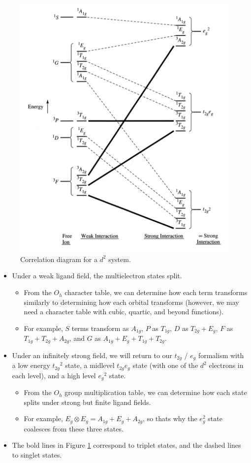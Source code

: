 \documentclass[../notes.tex]{subfiles}
\begin{document}
\begin{itemize}
    \begin{figure}[h!]
        \centering
        \includegraphics[width=0.45\linewidth]{../ExtFiles/correlationDiagram-d2.png}
        \caption{Correlation diagram for a $d^2$ system.}
        \label{fig:correlationDiagram-d2}
    \end{figure}
    \begin{itemize}
        \item Under a weak ligand field, the multielectron states split.
        \begin{itemize}
            \item From the $O_h$ character table, we can determine how each term transforms similarly to determining how each orbital transforms (however, we may need a character table with cubic, quartic, and beyond functions).
            \item For example, $S$ terms transform as $A_{1g}$, $P$ as $T_{1g}$, $D$ as $T_{2g}+E_g$, $F$ as $T_{1g}+T_{2g}+A_{2g}$, and $G$ as $A_{1g}+E_g+T_{1g}+T_{2g}$.
        \end{itemize}
        \item Under an infinitely strong field, we will return to our $t_{2g}$ / $e_g$ formalism with a low energy ${t_{2g}}^2$ state, a midlevel $t_{2g}e_g$ state (with one of the $d^2$ electrons in each level), and a high level ${e_g}^2$ state.
        \begin{itemize}
            \item From the $O_h$ group multiplication table, we can determine how each state splits under strong but finite ligand fields.
            \item For example, $E_g\otimes E_g=A_{1g}+E_g+A_{2g}$, so thats why the $e_g^2$ state coalesces from these three states.
        \end{itemize}
        \item The bold lines in Figure \ref{fig:correlationDiagram-d2} correspond to triplet states, and the dashed lines to singlet states.

\end{itemize}
\end{itemize}
\end{document}

